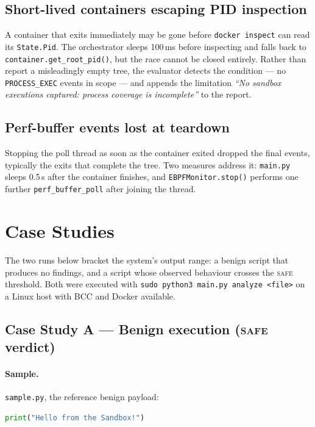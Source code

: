 \documentclass[11pt,a4paper]{article}
\newcommand{\code}[1]{\texttt{\small #1}}
\newcommand{\file}[1]{\texttt{\small #1}}
\begin{document}
\subsection{Short-lived containers escaping PID inspection}
A container that exits immediately may be gone before \code{docker inspect} can read
its \code{State.Pid}. The orchestrator sleeps 100\,ms before inspecting and falls
back to \code{container.get\_root\_pid()}, but the race cannot be closed entirely.
Rather than report a misleadingly empty tree, the evaluator detects the condition ---
no \code{PROCESS\_EXEC} events in scope --- and appends the limitation \emph{``No
sandbox executions captured: process coverage is incomplete''} to the report.

\subsection{Perf-buffer events lost at teardown}
Stopping the poll thread as soon as the container exited dropped the final events,
typically the exits that complete the tree. Two measures address it: \file{main.py}
sleeps 0.5\,s after the container finishes, and \code{EBPFMonitor.stop()} performs
one further \code{perf\_buffer\_poll} after joining the thread.

\section{Case Studies}

The two runs below bracket the system's output range: a benign script that produces
no findings, and a script whose observed behaviour crosses the \textsc{safe}
threshold. Both were executed with \code{sudo python3 main.py analyze <file>} on a
Linux host with BCC and Docker available.

\subsection{Case Study A --- Benign execution (\textsc{safe} verdict)}

\paragraph{Sample.} \file{sample.py}, the reference benign payload:

\begin{lstlisting}[language=Python,style=osda]
print("Hello from the Sandbox!")
\end{lstlisting}
\end{document}
